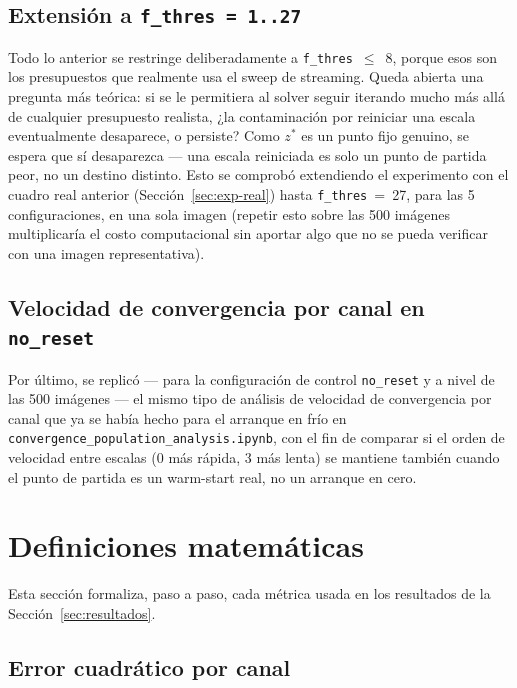 \documentclass[11pt,a4paper]{article}
\newcommand{\code}[1]{\texttt{#1}}
\begin{document}
\subsection{Extensión a \code{f\_thres = 1..27}}

Todo lo anterior se restringe deliberadamente a \code{f\_thres}~$\leq$~8, porque esos son los
presupuestos que realmente usa el sweep de streaming. Queda abierta una pregunta más teórica: si se
le permitiera al solver seguir iterando mucho más allá de cualquier presupuesto realista, ¿la
contaminación por reiniciar una escala eventualmente desaparece, o persiste? Como $z^*$ es un
punto fijo genuino, se espera que sí desaparezca --- una escala reiniciada es solo un punto de
partida peor, no un destino distinto. Esto se comprobó extendiendo el experimento con el cuadro
real anterior (Sección~\ref{sec:exp-real}) hasta \code{f\_thres}~=~27, para las 5 configuraciones,
en una sola imagen (repetir esto sobre las 500 imágenes multiplicaría el costo computacional sin
aportar algo que no se pueda verificar con una imagen representativa).

\subsection{Velocidad de convergencia por canal en \code{no\_reset}}

Por último, se replicó --- para la configuración de control \code{no\_reset} y a nivel de las 500
imágenes --- el mismo tipo de análisis de velocidad de convergencia por canal que ya se había hecho
para el arranque en frío en \code{convergence\_population\_analysis.ipynb}, con el fin de comparar
si el orden de velocidad entre escalas (0 más rápida, 3 más lenta) se mantiene también cuando el
punto de partida es un warm-start real, no un arranque en cero.


\section{Definiciones matemáticas}

Esta sección formaliza, paso a paso, cada métrica usada en los resultados de la
Sección~\ref{sec:resultados}.

\subsection{Error cuadrático por canal}
\end{document}
